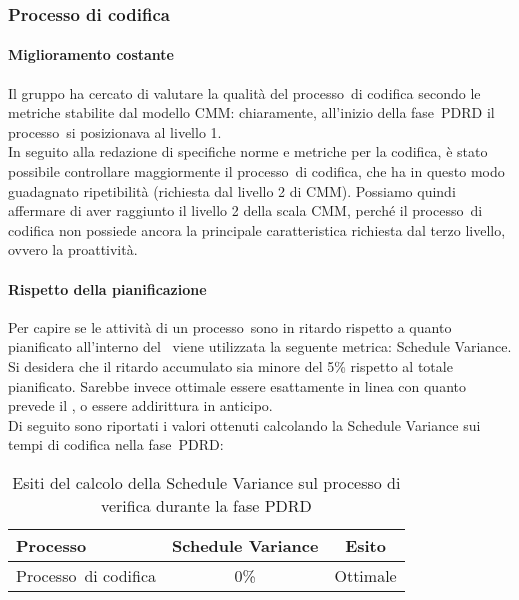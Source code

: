 \documentclass[../PianoDiQualifica.tex]{subfiles}
\begin{document}
\begin{appendices}
		\subsubsection{Processo di codifica}
			\paragraph{Miglioramento costante}
			Il gruppo ha cercato di valutare la qualità del processo\g\ di codifica secondo le metriche stabilite dal modello CMM\g: chiaramente, all'inizio della fase\g\ PDRD il processo\g\ si posizionava al livello 1.\\
			In seguito alla redazione di specifiche norme e metriche per la codifica, è stato possibile controllare maggiormente il processo\g\ di codifica, che ha in questo modo guadagnato ripetibilità (richiesta dal livello 2 di CMM\g).
			Possiamo quindi affermare di aver raggiunto il livello 2 della scala CMM\g, perché il processo\g\ di codifica non possiede ancora la principale caratteristica richiesta dal terzo livello, ovvero la proattività.\\
			
			\paragraph{Rispetto della pianificazione}
			Per capire se le attività di un processo\g\ sono in ritardo rispetto a quanto pianificato all'interno del \pianodiprogetto\ viene utilizzata la seguente metrica: Schedule Variance.\\
			Si desidera che il ritardo accumulato sia minore del 5\% rispetto al totale pianificato. Sarebbe invece ottimale essere esattamente in linea con quanto prevede il \pianodiprogetto, o essere addirittura in anticipo.\\
			Di seguito sono riportati i valori ottenuti calcolando la Schedule Variance sui tempi di codifica nella fase\g\ PDRD:
			
			\begin{table}[H]
				\centering
				\begin{tabular}{l * {2}{c}}
					\toprule
					\textbf{Processo} & \textbf{Schedule Variance} & \textbf{Esito} \\
					\midrule
					Processo\g\ di codifica & 0\% &  Ottimale \\
					\bottomrule
				\end{tabular}
				\caption{Esiti del calcolo della Schedule Variance sul processo di verifica durante la fase PDRD}
				\label{tab:esiti_schedule_variance}
			\end{table}
			

\end{appendices}
\end{document}
